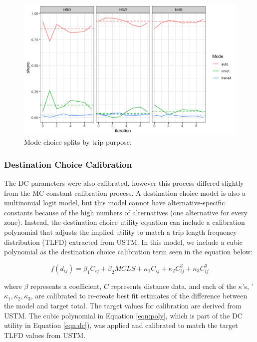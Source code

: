   \begin{figure}

  {\centering \includegraphics[width=0.75\linewidth]{figures/chapter3/MC_split.png}

  }

  \caption{Mode choice splits by trip purpose.}\label{fig:nhbmc}
  \end{figure}

\subsubsection{Destination Choice Calibration}

The DC parameters were also calibrated, however this process differed slightly
from the MC constant calibration process. A destination choice model is also a
multinomial logit model, but this model cannot have alternative-specific
constants because of the high numbers of alternatives (one alternative for
every zone). Instead, the destination choice utility equation can include a
calibration polynomial that adjusts the implied utility to match a trip length
frequency distribution (TLFD) extracted from USTM. In this model, we include a
cubic polynomial as the destination choice calibration term seen in the
equation below:

\begin{equation}
  f(d_{ij}) = \beta_1 C_{ij} + \beta_2 MCLS + \kappa_
  1 C_{ij} + \kappa_2 C_{ij}^2 + \kappa_3 C_{ij}^3
	\label{eqn:poly}
\end{equation}

\noindent where $\beta$ represents a coefficient, $C$ represents distance data,
and each of the $\kappa$'s, '$\kappa_1,\kappa_2,\kappa_3$, are calibrated to re-create best fit
estimates of the difference between the model and target total. The target
values for calibration are derived from USTM. The cubic polynomial in
Equation \ref{eqn:poly}, which is part of the DC utility in
Equation \ref{eqn:dc}), was applied and calibrated to match the target TLFD values from USTM.

